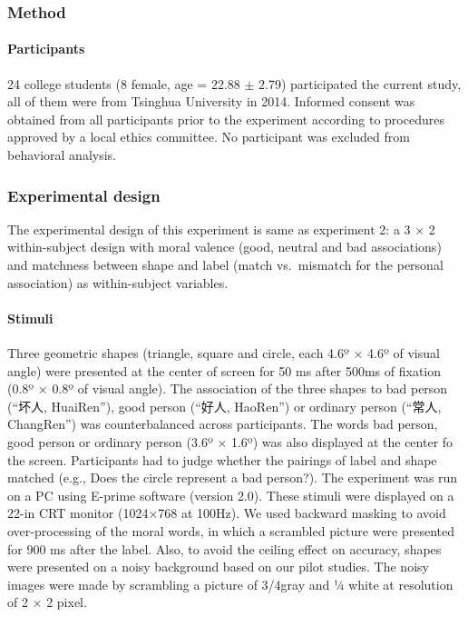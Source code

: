 \documentclass[
  english,
  man]{apa6}
\let\oldparagraph\paragraph
\renewcommand{\paragraph}[1]{\oldparagraph{#1}\mbox{}}
\begin{document}
\hypertarget{method-3}{%
\subsubsection{Method}\label{method-3}}

\hypertarget{participants-4}{%
\paragraph{Participants}\label{participants-4}}

24 college students (8 female, age = 22.88 \(\pm\) 2.79) participated the current study, all of them were from Tsinghua University in 2014. Informed consent was obtained from all participants prior to the experiment according to procedures approved by a local ethics committee. No participant was excluded from behavioral analysis.

\hypertarget{experimental-design}{%
\subsubsection{Experimental design}\label{experimental-design}}

The experimental design of this experiment is same as experiment 2: a 3 × 2 within-subject design with moral valence (good, neutral and bad associations) and matchness between shape and label (match vs.~mismatch for the personal association) as within-subject variables.

\hypertarget{stimuli}{%
\paragraph{Stimuli}\label{stimuli}}

Three geometric shapes (triangle, square and circle, each 4.6º × 4.6º of visual angle) were presented at the center of screen for 50 ms after 500ms of fixation (0.8º × 0.8º of visual angle). The association of the three shapes to bad person (\enquote{坏人, HuaiRen}), good person (\enquote{好人, HaoRen}) or ordinary person (\enquote{常人, ChangRen}) was counterbalanced across participants. The words bad person, good person or ordinary person (3.6º × 1.6º) was also displayed at the center fo the screen. Participants had to judge whether the pairings of label and shape matched (e.g., Does the circle represent a bad person?). The experiment was run on a PC using E-prime software (version 2.0). These stimuli were displayed on a 22-in CRT monitor (1024×768 at 100Hz).
We used backward masking to avoid over-processing of the moral words, in which a scrambled picture were presented for 900 ms after the label. Also, to avoid the ceiling effect on accuracy, shapes were presented on a noisy background based on our pilot studies. The noisy images were made by scrambling a picture of 3/4gray and ¼ white at resolution of 2 × 2 pixel.
\end{document}

